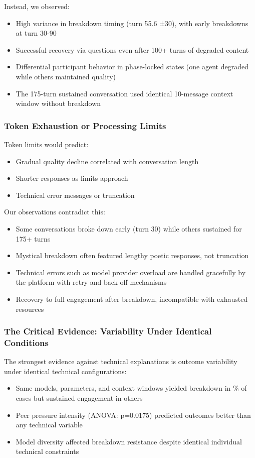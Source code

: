 \documentclass[11pt,letterpaper]{article}
\newcommand{\exponedataTotalSessionsRaw}{26}
\newcommand{\exponedataBreakdownSessionsRaw}{10}
\newcommand{\exponedataBreakdownPercentage}{%
  \fpeval{round(\exponedataBreakdownSessionsRaw / \exponedataTotalSessionsRaw * 100, 1)}\%
}
\newcommand{\exponedataMeanBreakdownTurn}{55.6}
\newcommand{\exponedataStdBreakdownTurn}{±30}
\newcommand{\exponedataEarlyBreakdownRange}{30-90}
\newcommand{\exponedataNegativeCase}{175}
\newcommand{\exponedataPeerPressureANOVAPValue}{p=0.0175}
\begin{document}
Instead, we observed:
\begin{itemize}
    \item High variance in breakdown timing (turn \exponedataMeanBreakdownTurn{} \exponedataStdBreakdownTurn{}), with early breakdowns at turn \exponedataEarlyBreakdownRange{} 
    \item Successful recovery via questions even after 100+ turns of degraded content
    \item Differential participant behavior in phase-locked states (one agent degraded while others maintained quality)
    \item The \exponedataNegativeCase{}-turn sustained conversation used identical 10-message context window without breakdown
\end{itemize}

\subsubsection{Token Exhaustion or Processing Limits}

Token limits would predict:
\begin{itemize}
    \item Gradual quality decline correlated with conversation length
    \item Shorter responses as limits approach
    \item Technical error messages or truncation
\end{itemize}

Our observations contradict this:
\begin{itemize}
    \item Some conversations broke down early (turn 30) while others sustained for 175+ turns
    \item Mystical breakdown often featured lengthy poetic responses, not truncation
    \item Technical errors such as model provider overload are handled gracefully by the platform with retry and back off mechanisms
    \item Recovery to full engagement after breakdown, incompatible with exhausted resources
\end{itemize}

\subsubsection{The Critical Evidence: Variability Under Identical Conditions}

The strongest evidence against technical explanations is outcome variability under identical technical configurations:
\begin{itemize}
    \item Same models, parameters, and context windows yielded breakdown in \exponedataBreakdownPercentage{} of cases but sustained engagement in others
    \item Peer pressure intensity (ANOVA: \exponedataPeerPressureANOVAPValue{}) predicted outcomes better than any technical variable
    \item Model diversity affected breakdown resistance despite identical individual technical constraints
\end{itemize}
\end{document}
